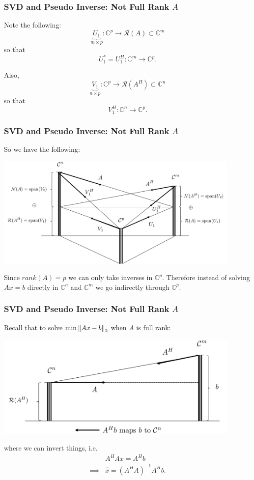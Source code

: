 \documentclass{beamer}
\begin{document}
\begin{frame}\frametitle{SVD and Pseudo Inverse: Not Full Rank $A$}
	Note the following:
	\[ 
		\underbrace{U_1}_{m \times p}: \mathbb{C}^p \to \mathcal{R}(A) \subset \mathbb{C}^m
	\]
	so that
	\[ 
		U_1^\ast = U_1^H:\mathbb{C}^m\to\mathbb{C}^p.
	\]
	
	Also,
	\[ 
		\underbrace{V_1}_{n\times p}: \mathbb{C}^p \to 
			\mathcal{R}(A^H) \subset \mathbb{C}^n 
	\]
	so that
	\[ 
		V_1^H : \mathbb{C}^n \to \mathbb{C}^p.
	\]	
\end{frame}

\begin{frame}\frametitle{SVD and Pseudo Inverse: Not Full Rank $A$}
	So we have the following:
	\begin{center}
		\includegraphics[width=0.9\textwidth]
			{figures/chap7_svd_1}
	\end{center}	
	Since $rank(A) = p$ we can only take inverses in 
	$\mathbb{C}^p$.  
	Therefore instead of solving $Ax=b$ directly in 
	$\mathbb{C}^n$ and 
	$\mathbb{C}^m$ we go indirectly through $\mathbb{C}^p$.
\end{frame}

\begin{frame}\frametitle{SVD and Pseudo Inverse: Not Full Rank $A$}
	\par{}
	
	Recall that to solve $\min\left\|Ax-b\right\|_2$ when $A$ is full rank:
	\begin{center}
		\includegraphics[width=0.9\textwidth]
			{figures/chap7_svd_2}
	\end{center}
	where we can invert things, i.e.
	\begin{align*}
		& A^HAx = A^Hb \\
		\implies & \hat{x} = (A^H A)^{-1} A^H b.
	\end{align*}
\end{frame}
\end{document}
